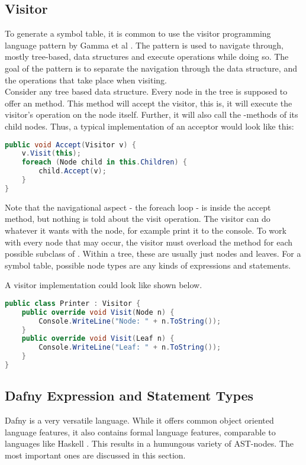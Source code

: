 
\subsection{Visitor}
To generate a symbol table, it is common to use the visitor programming language pattern by Gamma et al \cite{gof}.
The pattern is used to navigate through, mostly tree-based, data structures and execute operations while doing so.
The goal of the pattern is to separate the navigation through the data structure, and the operations that take place when visiting.\\

Consider any tree based data structure.
Every node in the tree is supposed to offer an  method.
This method will accept the visitor, this is, it will execute the visitor's operation on the node itself.
Further, it will also call the -methods of its child nodes.
Thus, a typical implementation of an acceptor would look like this:

\begin{lstlisting}[language=csharp, caption={Example for Accept}, captionpos=b, label={lst:accept}]
public void Accept(Visitor v) {
    v.Visit(this);
    foreach (Node child in this.Children) {
        child.Accept(v);
    }
}
\end{lstlisting}

Note that the navigational aspect - the foreach loop - is inside the accept method, but nothing is told about the visit operation.
The visitor can do whatever it wants with the node, for example print it to the console.
To work with every node that may occur, the visitor must overload the  method for each possible subclass of .
Within a tree, these are usually just nodes and leaves.
For a symbol table, possible node types are any kinds of expressions and statements.

A visitor implementation could look like shown below.

\begin{lstlisting}[language=csharp, caption={Example for Visitor}, captionpos=b, label={lst:visitor}]
public class Printer : Visitor {
    public override void Visit(Node n) {
        Console.WriteLine("Node: " + n.ToString());
    }
    public override void Visit(Leaf n) {
        Console.WriteLine("Leaf: " + n.ToString());
    }
}
\end{lstlisting}

\subsection{Dafny Expression and Statement Types}
\label{section:analysis_dafnyASTStuff}
Dafny is a very versatile language.
While it offers common object oriented language features, it also contains formal language features, comparable to languages like Haskell \cite{haskell}.
This results in a humungous variety of AST-nodes.
The most important ones are discussed in this section.\\

